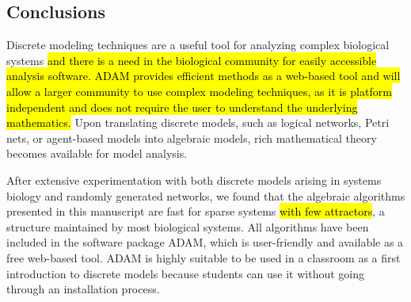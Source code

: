 \documentclass[10pt]{bmc_article}
\newenvironment{bmcformat}{\begin{raggedright}\baselineskip20pt\sloppy\setboolean{publ}{false}}{\end{raggedright}\baselineskip20pt\sloppy}
\begin{document}
\begin{bmcformat}
%
%


    

\section*{Conclusions}
Discrete modeling techniques are a useful tool for analyzing complex biological systems \hl{and there is a need in the biological community for easily accessible analysis software. ADAM provides efficient methods as a web-based tool and will allow a larger community to use complex modeling techniques, as it is platform independent and does not require the user to understand the underlying mathematics.}
Upon translating discrete models, such as logical networks,
Petri nets, or agent-based models into algebraic models, rich mathematical
theory becomes available for model analysis.

After extensive experimentation with both discrete models arising in systems biology and randomly generated networks, we found that the algebraic algorithms presented in this manuscript
are fast for sparse systems \hl{with few attractors}, a structure maintained by most biological
systems. All algorithms have been included in the software package ADAM\cite{ADAM},
which is user-friendly and available as a free web-based tool.
ADAM is highly suitable to be used in a classroom as a first
introduction to discrete models because students can use it without going through an installation process.


\end{bmcformat}
\end{document}
